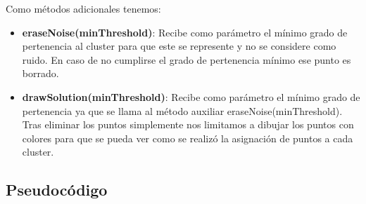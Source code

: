 \documentclass[conference,a4paper]{IEEEtran}
\begin{document}
Como métodos adicionales tenemos:

\begin{itemize}

	\item{\textbf{eraseNoise(minThreshold)}: Recibe como parámetro el mínimo grado de pertenencia al cluster para que este se represente y no se considere como ruido. En caso de no cumplirse el grado de pertenencia mínimo ese punto es borrado.}

	\item{\textbf{drawSolution(minThreshold)}: Recibe como parámetro el mínimo grado de pertenencia ya que se llama al método auxiliar eraseNoise(minThreshold). Tras eliminar los puntos simplemente nos limitamos a dibujar los puntos con colores para que se pueda ver como se realizó la asignación de puntos a cada cluster.}

\end{itemize}

\subsection{Pseudocódigo}
\end{document}
